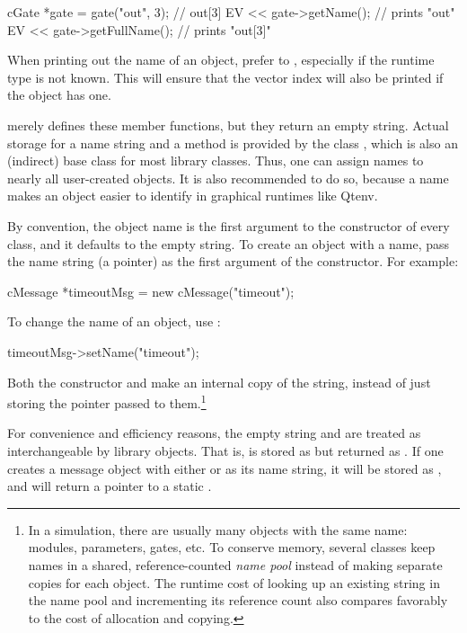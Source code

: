 \begin{cpp}
cGate *gate = gate("out", 3);  // out[3]
EV << gate->getName();  // prints "out"
EV << gate->getFullName();  // prints "out[3]"
\end{cpp}

\begin{note}
When printing out the name of an object, prefer  to
, especially if the runtime type is not known. This will
ensure that the vector index will also be printed if the object has one.
\end{note}

 merely defines these member functions, but they return an
empty string. Actual storage for a name string and a 
method is provided by the class , which is also an
(indirect) base class for most library classes. Thus, one can assign names
to nearly all user-created objects. It is also recommended to do so, because
a name makes an object easier to identify in graphical runtimes like Qtenv.

By convention, the object name is the first argument to the constructor
of every class, and it defaults to the empty string. To create an object with
a name, pass the name string (a  pointer) as the first
argument of the constructor. For example:

\begin{cpp}
cMessage *timeoutMsg = new cMessage("timeout");
\end{cpp}

To change the name of an object, use :

\begin{cpp}
timeoutMsg->setName("timeout");
\end{cpp}

Both the constructor and  make an internal copy of the string,
instead of just storing the pointer passed to them.\footnote{
  In a simulation, there are usually many objects with the same name:
  modules, parameters, gates, etc. To conserve memory, several classes
  keep names in a shared, reference-counted \textit{name pool} instead of
  making separate copies for each object. The runtime cost of looking up an
  existing string in the name pool and incrementing its reference count
  also compares favorably to the cost of allocation and copying.}

For convenience and efficiency reasons, the empty string 
and  are treated as interchangeable by library objects.
That is,  is stored as  but returned as .
If one creates a message object with either 
or  as its name string, it will be stored as ,
and  will return a pointer to a static .



